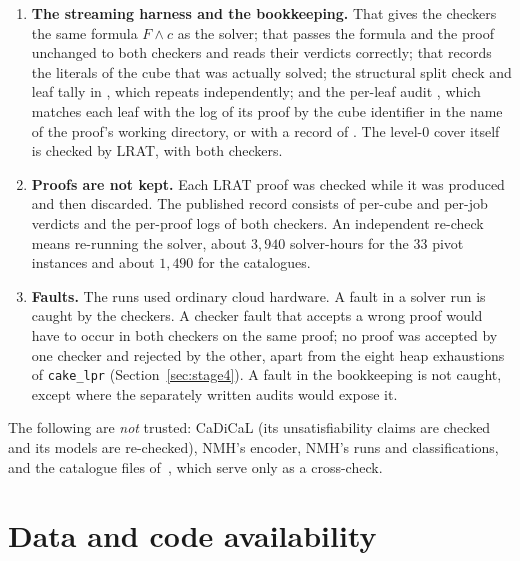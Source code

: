 \documentclass[11pt]{amsart}
\theoremstyle{definition}
\theoremstyle{remark}
\begin{document}
\begin{enumerate}[label=\textbf{T\arabic*.},leftmargin=*]
\item \textbf{The streaming harness and the bookkeeping.} That
   gives the checkers the same formula
  $F \wedge c$ as the solver; that  passes the
  formula and the proof unchanged to both checkers and reads their verdicts
  correctly; that  records the literals of the cube
  that was actually solved; the structural split check and leaf tally in
  , which  repeats
  independently; and the per-leaf audit ,
  which matches each leaf with the log of its proof by the cube identifier in
  the name of the proof's working directory, or with a record of
  . The level-$0$ cover itself is checked
  by LRAT, with both checkers.

\item \textbf{Proofs are not kept.} Each LRAT proof was checked while it was
  produced and then discarded. The published record consists of per-cube and
  per-job verdicts and the per-proof logs of both checkers. An independent
  re-check means re-running the solver, about $3{,}940$ solver-hours for the
  $33$ pivot instances and about $1{,}490$ for the catalogues.

\item \textbf{Faults.} The runs used ordinary cloud hardware. A fault in a
  solver run is caught by the checkers. A checker fault that accepts a wrong
  proof would have to occur in both checkers on the same proof; no proof was
  accepted by one checker and rejected by the other, apart from the eight heap
  exhaustions of \texttt{cake\_lpr} (Section~\ref{sec:stage4}). A fault in the
  bookkeeping is not caught, except where the separately written audits would
  expose it.
\end{enumerate}

The following are \emph{not} trusted: CaDiCaL (its unsatisfiability claims are
checked and its models are re-checked), NMH's encoder, NMH's runs and
classifications, and the catalogue files of~\cite{LLHrepo}, which serve only as
a cross-check.

\section{Data and code availability}\label{sec:data}
\end{document}
